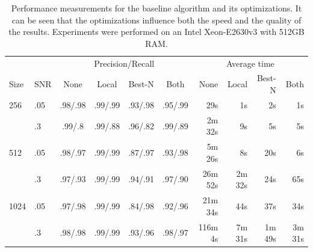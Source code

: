 \documentclass{llncs}
\begin{document}
\begin{table}[p]
\caption{Performance measurements for the baseline algorithm and its optimizations. It can be seen that the optimizations influence both the speed and the quality of the results. Experiments were performed on an Intel Xeon-E2630v3 with 512GB RAM.}
\label{table:optimize}
\begin{tabular*}{\textwidth}{l @{\extracolsep{\fill}}lccccrrrr}
\toprule
 & & \multicolumn{4}{c}{Precision/Recall} & \multicolumn{4}{c}{Average time}\\
 \cmidrule(l){3-6} \cmidrule(l){7-10} 
 Size & SNR & None & Local & Best-N & Both & None & Local & Best-N & Both \\
\midrule
 256 & .05 & .98/.98 & .99/.99 & .93/.98 & .95/.99 & 29s & 1s & 2s & 1s \\
   & .3 &.99/.8 & .99/.88 & .96/.82 & .99/.89 & 2m 32s & 9s & 5s & 5s \\
 512 & .05 & .98/.97 & .99/.99 & .87/.97 & .93/.98 & 5m 26s & 8s & 20s & 6s \\
  & .3 &.97/.93 & .99/.99 & .94/.91 & .97/.90 & 26m 52s & 2m 32s & 24s & 65s \\
 1024 & .05 & .97/.98 & .99/.99 & .84/.98 & .92/.96 & 21m 34s & 44s & 37s & 34s \\
 & .3 &.98/.98 & .99/.99 & .93/.96 & .98/.97 & 116m 4s & 7m 31s & 1m 49s & 3m 31s \\
\bottomrule
\end{tabular*}
\end{table}
\end{document}
